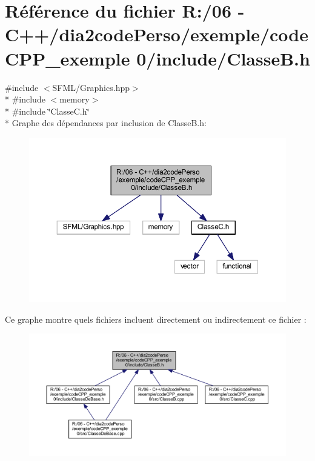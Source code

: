 \section{Référence du fichier R\+:/06 -\/ C++/dia2code\+Perso/exemple/code\+C\+P\+P\+\_\+exemple 0/include/\+Classe\+B.h}
\label{_classe_b_8h}
{\ttfamily \#include $<$S\+F\+M\+L/\+Graphics.\+hpp$>$}\\*
{\ttfamily \#include $<$memory$>$}\\*
{\ttfamily \#include \char`\"{}Classe\+C.\+h\char`\"{}}\\*
Graphe des dépendances par inclusion de Classe\+B.\+h\+:
\nopagebreak
\begin{figure}[H]
\begin{center}
\leavevmode
\includegraphics[width=350pt]{_classe_b_8h__incl}
\end{center}
\end{figure}
Ce graphe montre quels fichiers incluent directement ou indirectement ce fichier \+:
\nopagebreak
\begin{figure}[H]
\begin{center}
\leavevmode
\includegraphics[width=350pt]{_classe_b_8h__dep__incl}
\end{center}
\end{figure}
